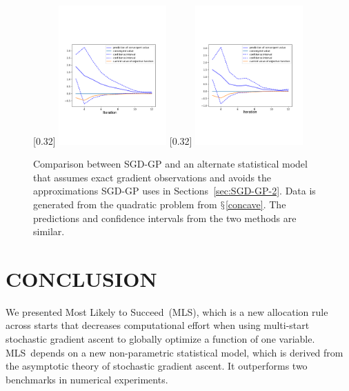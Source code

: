 \documentclass{wscpaperproc}
\theoremstyle{wsc}
\newcommand{\abbrv}{MLS}
\newcommand{\name}{Most Likely to Succeed}
\begin{document}
\begin{figure}[tb]
\centering
{}[0.32\linewidth]{
\includegraphics[width=0.32\linewidth,height=2.1in]{quadratic_stat_approx_lipschitz.pdf}}
[0.32\linewidth]{
\includegraphics[width=0.32\linewidth,height=2.1in]{real_gradient_stat.pdf}}
\caption{Comparison between SGD-GP and an alternate statistical model that assumes exact gradient observations and avoids the approximations SGD-GP uses in Sections~\ref{sec:SGD-GP-2}.  Data is generated from the quadratic problem from $\mathsection$\ref{concave}. The predictions and confidence intervals from the two methods are similar.}
\label{fig:SGD-GP}
\end{figure}



\section{CONCLUSION}
\label{conclusion}

We presented \name\ (\abbrv), which is a new allocation rule across starts that decreases computational effort when using multi-start stochastic gradient ascent to globally optimize a function of one variable. \abbrv\ depends on a new non-parametric statistical model, which is derived from the asymptotic theory of stochastic gradient ascent. It outperforms two benchmarks in numerical experiments.
 
\end{document}

